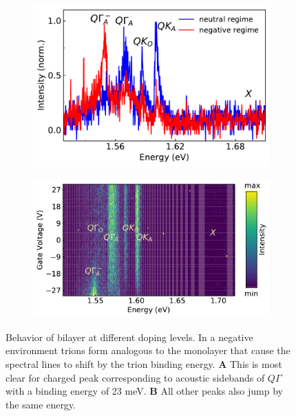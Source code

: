\begin{figure}[t]
	\begin{subfigure}{0.49\textwidth}
		\caption{}
		\includegraphics[height=0.65\textwidth]{BL_lowhigh}
	\end{subfigure}
	\begin{subfigure}{0.49\textwidth}
		\caption{}
		\includegraphics[height=0.65\textwidth]{BL_sweep}
	\end{subfigure}
	\caption{Behavior of bilayer \wse at different doping levels. In a negative environment trions form analogous to the monolayer that cause the spectral lines to shift by the trion binding energy. \textbf{A} This is most clear for charged peak corresponding to acoustic sidebands of $Q\Gamma$ with a binding energy of 23 meV. \textbf{B} All other peaks also jump by the same energy.} 
	\label{bilayervoltsweep}
\end{figure}

